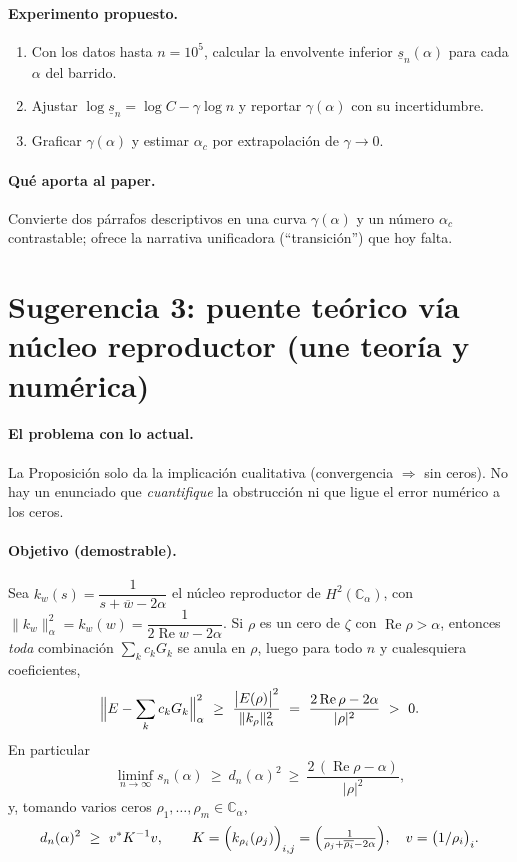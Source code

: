 \documentclass[11pt]{article}
\newcommand{\C}{\mathbb{C}}
\newcommand{\Reop}{\operatorname{Re}}
\theoremstyle{plain}
\theoremstyle{definition}
\theoremstyle{remark}
\begin{document}
\paragraph{Experimento propuesto.}
\begin{enumerate}[leftmargin=*]
  \item Con los datos hasta $n=10^5$, calcular la envolvente inferior $\underline{s}_n(\alpha)$
        para cada $\alpha$ del barrido.
  \item Ajustar $\log\underline{s}_n=\log C-\gamma\log n$ y reportar $\gamma(\alpha)$ con su
        incertidumbre.
  \item Graficar $\gamma(\alpha)$ y estimar $\alpha_c$ por extrapolaci\'on de $\gamma\to0$.
\end{enumerate}

\paragraph{Qu\'e aporta al paper.} Convierte dos p\'arrafos descriptivos en una curva
$\gamma(\alpha)$ y un n\'umero $\alpha_c$ contrastable; ofrece la narrativa unificadora
(``transici\'on'') que hoy falta.

\bigskip

\section*{Sugerencia 3: puente te\'orico v\'ia n\'ucleo reproductor (une teor\'ia y num\'erica)}

\paragraph{El problema con lo actual.} La Proposici\'on solo da la implicaci\'on cualitativa
(convergencia $\Rightarrow$ sin ceros). No hay un enunciado que \emph{cuantifique} la obstrucci\'on
ni que ligue el error num\'erico a los ceros.

\paragraph{Objetivo (demostrable).} Sea $k_w(s)=\dfrac1{s+\overline{w}-2\alpha}$ el n\'ucleo
reproductor de $H^2(\C_\alpha)$, con $\|k_w\|_\alpha^2=k_w(w)=\dfrac1{2\Reop w-2\alpha}$. Si
$\rho$ es un cero de $\zeta$ con $\Reop\rho>\alpha$, entonces \emph{toda} combinaci\'on
$\sum_k c_kG_k$ se anula en $\rho$, luego para todo $n$ y cualesquiera coeficientes,
\[
\Bigl\|E-\sum_{k}c_kG_k\Bigr\|_\alpha^2
\ \ge\ \frac{\bigl|E(\rho)\bigr|^2}{\|k_\rho\|_\alpha^2}
\ =\ \frac{2\Reop\rho-2\alpha}{|\rho|^2}\ >\ 0 .
\]
En particular
\[
\liminf_{n\to\infty}s_n(\alpha)\ \ge\ d_n(\alpha)^2\ \ge\ \frac{2\,(\Reop\rho-\alpha)}{|\rho|^2},
\]
y, tomando varios ceros $\rho_1,\dots,\rho_m\in\C_\alpha$,
\[
d_n(\alpha)^2\ \ge\ v^{*}K^{-1}v,\qquad
K=\Bigl(k_{\rho_i}(\rho_j)\Bigr)_{i,j}=\Bigl(\tfrac1{\rho_j+\overline{\rho_i}-2\alpha}\Bigr),\quad
v=\bigl(1/\rho_i\bigr)_i .
\]
\end{document}
